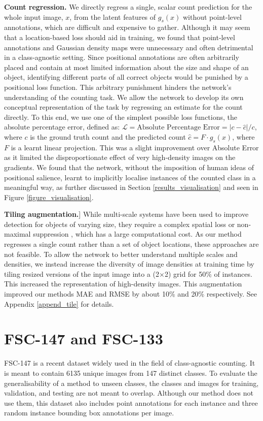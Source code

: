 \documentclass[letterpaper, 11pt]{IEEEtran}
\begin{document}
\textbf{Count regression.}
We directly regress a single, scalar count prediction
for the whole input image, $x$, from the latent features of $g_s(x)$ without point-level annotations, which are difficult and expensive to gather.
Although it may seem that a location-based loss should aid in training, we found that point-level annotations and Gaussian density maps were unnecessary and often detrimental in a class-agnostic setting. 
Since positional annotations are often arbitrarily placed and contain at most limited information about the size and shape of an object, identifying different parts of all correct objects would be punished by a positional loss function. This arbitrary punishment hinders the network's understanding of the counting task.
We allow the network to develop its own conceptual representation of the task by regressing an estimate for the count directly. To this end, we use one of the simplest possible loss functions, the absolute percentage error, defined as: $\mathcal{L} = \text{Absolute Percentage Error}= \lvert c - \hat{c} \rvert/c $, where $c$ is the ground truth count and the predicted count $\hat{c} = F \cdot g_s(x)$, where $F$ is a learnt linear projection. This was a slight improvement over Absolute Error as it limited the disproportionate effect of very high-density images on the gradients.
We found that the network, without the imposition of human ideas of positional salience, learnt to implicitly localise instances of the counted class in a meaningful way, as further discussed in Section \ref{results_visualisation} and seen in Figure \ref{figure_visualisation}.

\textbf{Tiling augmentation.}]
While multi-scale systems have been used to improve detection for objects of varying size, they require a complex spatial loss \cite{redmon2016YOLO} or non-maximal suppression \cite{ren2015fasterrcnn}, which has a large computational cost.
As our method regresses a single count rather than a set of object locations, these approaches are not feasible.
To allow the network to better understand  multiple scales and densities, we instead increase the diversity of image densities at training time by tiling resized versions of the input image into a (2$\times$2) grid for 50\% of instances.  This increased the representation of high-density images.
This augmentation improved our methods MAE and RMSE by about 10\% and 20\% respectively. See Appendix \ref{append_tile} for details.

\section{FSC-147 and FSC-133}
FSC-147 \cite{ranjan2021Famnet} is a recent dataset widely used in the field of class-agnostic counting. 
It is meant to contain 6135 unique images from 147 distinct classes. To evaluate the generalisability of a method to unseen classes, the classes and images for training, validation, and testing are not meant to  overlap.
Although our method does not use them, this dataset also includes point annotations for each instance and three random instance bounding box annotations per image. 
\end{document}
